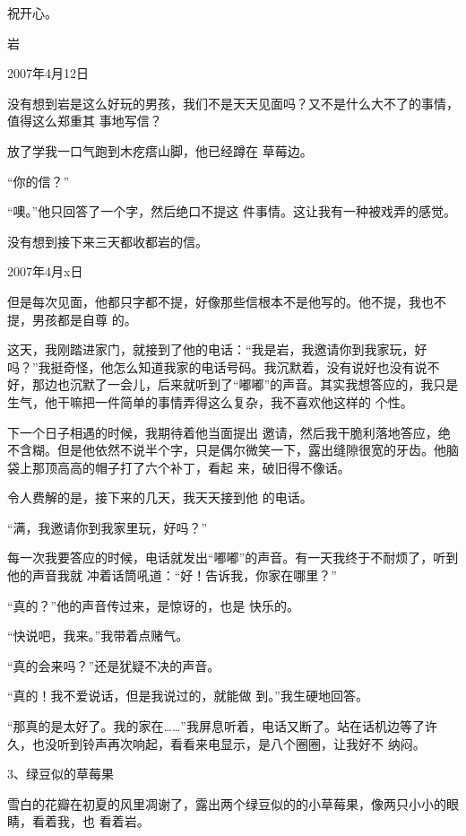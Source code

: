 \documentclass{article}
\begin{document}
祝开心。 


岩 


2007年4月12日 

没有想到岩是这么好玩的男孩，我们不是天天见面吗？又不是什么大不了的事情，值得这么郑重其
事地写信？ 

放了学我一口气跑到木疙瘩山脚，他已经蹲在
草莓边。 


“你的信？” 

“噢。”他只回答了一个字，然后绝口不提这
件事情。这让我有一种被戏弄的感觉。 


\newpage

没有想到接下来三天都收都岩的信。 







2007年4月x日 

但是每次见面，他都只字都不提，好像那些信根本不是他写的。他不提，我也不提，男孩都是自尊
的。 

这天，我刚踏进家门，就接到了他的电话：“我是岩，我邀请你到我家玩，好吗？”我挺奇怪，他怎么知道我家的电话号码。我沉默着，没有说好也没有说不好，那边也沉默了一会儿，后来就听到了“嘟嘟”的声音。其实我想答应的，我只是生气，他干嘛把一件简单的事情弄得这么复杂，我不喜欢他这样的
个性。 

下一个日子相遇的时候，我期待着他当面提出
\newpage
邀请，然后我干脆利落地答应，绝不含糊。但是他依然不说半个字，只是偶尔微笑一下，露出缝隙很宽的牙齿。他脑袋上那顶高高的帽子打了六个补丁，看起
来，破旧得不像话。 

令人费解的是，接下来的几天，我天天接到他
的电话。 


“满，我邀请你到我家里玩，好吗？” 

每一次我要答应的时候，电话就发出“嘟嘟”的声音。有一天我终于不耐烦了，听到他的声音我就
冲着话筒吼道：“好！告诉我，你家在哪里？” 

“真的？”他的声音传过来，是惊讶的，也是
快乐的。 


“快说吧，我来。”我带着点赌气。 


“真的会来吗？”还是犹疑不决的声音。 

\newpage

“真的！我不爱说话，但是我说过的，就能做
到。”我生硬地回答。 

“那真的是太好了。我的家在……”我屏息听着，电话又断了。站在话机边等了许久，也没听到铃声再次响起，看看来电显示，是八个圈圈，让我好不
纳闷。 


3、绿豆似的草莓果 

雪白的花瓣在初夏的风里凋谢了，露出两个绿豆似的的小草莓果，像两只小小的眼睛，看着我，也
看着岩。 
\end{document}
